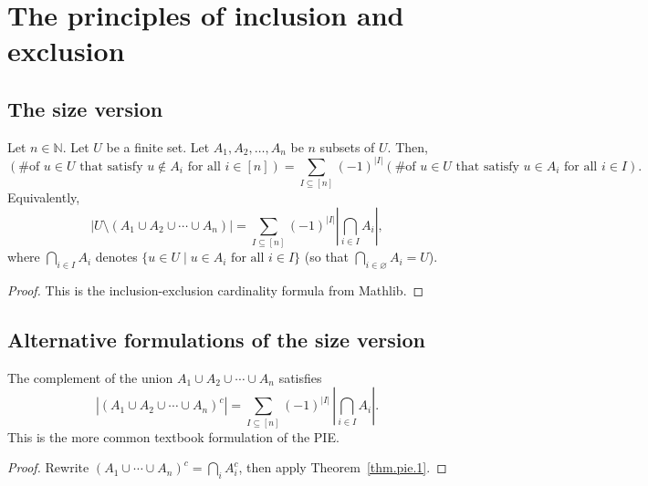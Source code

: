 \section{The principles of inclusion and exclusion}

\subsection{The size version}

\begin{theorem}
\label{thm.pie.1}
\leantarget
\leanok
Let $n \in \mathbb{N}$. Let $U$ be a finite set. Let $A_1, A_2, \ldots, A_n$ be $n$ subsets of $U$. Then,
\[
\left(\text{\# of } u \in U \text{ that satisfy } u \notin A_i \text{ for all } i \in [n]\right)
= \sum_{I \subseteq [n]} (-1)^{|I|} \left(\text{\# of } u \in U \text{ that satisfy } u \in A_i \text{ for all } i \in I\right).
\]
Equivalently,
\[
\left| U \setminus (A_1 \cup A_2 \cup \cdots \cup A_n) \right|
= \sum_{I \subseteq [n]} (-1)^{|I|} \left| \bigcap_{i \in I} A_i \right|,
\]
where $\bigcap_{i \in I} A_i$ denotes $\{u \in U \mid u \in A_i \text{ for all } i \in I\}$
(so that $\bigcap_{i \in \varnothing} A_i = U$).
\end{theorem}

\begin{proof}
This is the inclusion-exclusion cardinality formula from Mathlib.
\end{proof}

\subsection{Alternative formulations of the size version}

\begin{lemma}
\label{lem.pie.size-version-prime}
\leanhelper
\leanok
The complement of the union $A_1 \cup A_2 \cup \cdots \cup A_n$ satisfies
\[
\left| (A_1 \cup A_2 \cup \cdots \cup A_n)^c \right|
= \sum_{I \subseteq [n]} (-1)^{|I|}\, \left|\bigcap_{i \in I} A_i\right|.
\]
This is the more common textbook formulation of the PIE.
\end{lemma}

\begin{proof}
Rewrite $(A_1 \cup \cdots \cup A_n)^c = \bigcap_i A_i^c$, then apply
Theorem~\ref{thm.pie.1}.
\end{proof}

